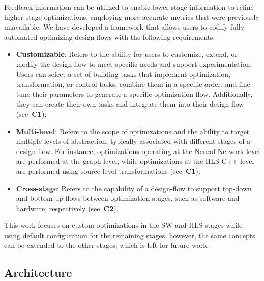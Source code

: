 Feedback information can be utilized to enable lower-stage information to refine higher-stage optimizations, employing more accurate metrics that were previously unavailable. We have developed a framework that allows users to codify fully automated optimizing design-flows with the following requirements:

\begin{itemize}

\item \textbf{Customizable}: Refers to the ability for users to customize, extend, or modify the design-flow to meet specific needs and support experimentation. Users can select a set of building tasks that implement optimization, transformation, or control tasks, combine them in a specific order, and fine-tune their parameters to generate a specific optimization flow. Additionally, they can create their own tasks and integrate them into their design-flow (see~\textbf{C1});

\item \textbf{Multi-level}: Refers to the scope of optimizations and the ability to target multiple levels of abstraction, typically associated with different stages of a design-flow. For instance, optimizations operating at the Neural Network level are performed at the graph-level, while optimizations at the HLS C++ level are performed using source-level transformations (see~\textbf{C1});

\item \textbf{Cross-stage}: Refers to the capability of a design-flow to support top-down and bottom-up flows between optimization stages, such as software and hardware, respectively (see~\textbf{C2}).

\end{itemize}

This work focuses on custom optimizations in the SW and HLS stages while using default configuration for the remaining stages, however, the same concepts can be extended to the other stages, which is left for future work.


%


\subsection{Architecture}

